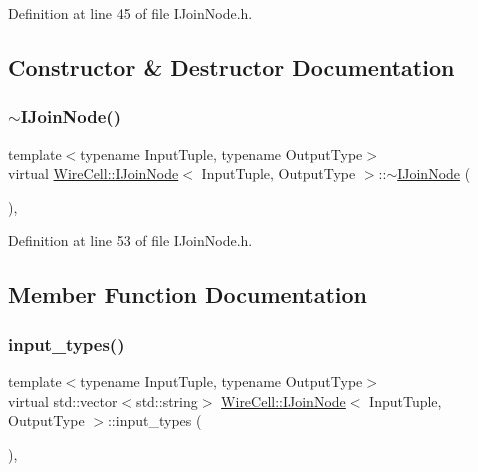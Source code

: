 Definition at line 45 of file I\+Join\+Node.\+h.



\subsection{Constructor \& Destructor Documentation}
\mbox{\label{class_wire_cell_1_1_i_join_node_abc2bb6894c26c1a7bf6eac433a2fa25b}} 
\subsubsection{\texorpdfstring{$\sim$\+I\+Join\+Node()}{~IJoinNode()}}
{\footnotesize\ttfamily template$<$typename Input\+Tuple, typename Output\+Type$>$ \\
virtual \hyperlink{class_wire_cell_1_1_i_join_node}{Wire\+Cell\+::\+I\+Join\+Node}$<$ Input\+Tuple, Output\+Type $>$\+::$\sim$\hyperlink{class_wire_cell_1_1_i_join_node}{I\+Join\+Node} (\begin{DoxyParamCaption}{ }\end{DoxyParamCaption})\hspace{0.3cm}{\ttfamily [inline]}, {\ttfamily [virtual]}}



Definition at line 53 of file I\+Join\+Node.\+h.



\subsection{Member Function Documentation}
\mbox{\label{class_wire_cell_1_1_i_join_node_a2a9b72881831998cb7c66825f2101abb}} 
\subsubsection{\texorpdfstring{input\+\_\+types()}{input\_types()}}
{\footnotesize\ttfamily template$<$typename Input\+Tuple, typename Output\+Type$>$ \\
virtual std\+::vector$<$std\+::string$>$ \hyperlink{class_wire_cell_1_1_i_join_node}{Wire\+Cell\+::\+I\+Join\+Node}$<$ Input\+Tuple, Output\+Type $>$\+::input\+\_\+types (\begin{DoxyParamCaption}{ }\end{DoxyParamCaption})\hspace{0.3cm}{\ttfamily [inline]}, {\ttfamily [virtual]}}



